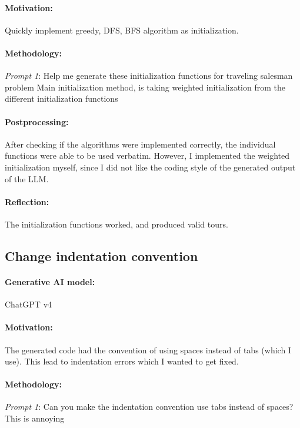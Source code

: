 \documentclass[a4paper,10pt]{article} %
\begin{document}
\paragraph{Motivation:}
Quickly implement greedy, DFS, BFS algorithm as initialization.
\paragraph{Methodology:} 
\textit{Prompt 1}: 
Help me generate these initialization functions for traveling salesman problem Main initialization method, is taking weighted initialization from the different initialization functions

\paragraph{Postprocessing:} 

After checking if the algorithms were implemented correctly, the individual functions were able to be used verbatim.
However, I implemented the weighted initialization myself, since I did not like the coding style of the generated output of the LLM.

\paragraph{Reflection:} 
The initialization functions worked, and produced valid tours.



\subsection{Change indentation convention} 
\paragraph{Generative AI model:} ChatGPT v4
\paragraph{Motivation:}
The generated code had the convention of using spaces instead of tabs (which I use).
This lead to indentation errors which I wanted to get fixed.
\paragraph{Methodology:} 
\textit{Prompt 1}: 
Can you make the indentation convention use tabs instead of spaces? This is annoying
\end{document}
